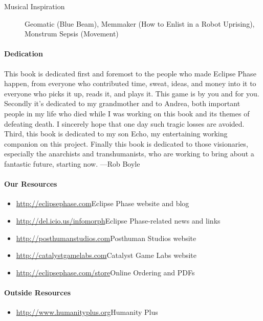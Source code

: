 \begin{description}
\item[Musical Inspiration] Geomatic (Blue Beam), Memmaker (How to Enlist in a Robot Uprising), Monstrum Sepsis (Movement) 

\end{description} 

\pagebreak



\paragraph{Dedication} 

This book is dedicated first and foremost to the people who made Eclipse Phase happen, from everyone who contributed time, sweat, ideas, and money into it to everyone who picks it up, reads it, and plays it. This game is by you and for you. Secondly it's dedicated to my grandmother and to Andrea, both important people in my life who died while I was working on this book and its themes of defeating death. I sincerely hope that one day such tragic losses are avoided. Third, this book is dedicated to my son Echo, my entertaining working companion on this project. Finally this book is dedicated to those visionaries, especially the anarchists and transhumanists, who are working to bring about a fantastic future, starting now. —Rob Boyle 

\paragraph{Our Resources} 

\begin{itemize} \item \url{http://eclipsephase.com}{Eclipse Phase website and blog} \item \url{http://del.icio.us/infomorph}{Eclipse Phase-related news and links} \item \url{http://posthumanstudios.com}{Posthuman Studios website} \item \url{http://catalystgamelabs.com}{Catalyst Game Labs website} \item \url{http://eclipsephase.com/store}{Online Ordering and PDFs} \end{itemize} 

\paragraph{Outside Resources} \label{sec:outside-resources} 

\begin{itemize} \item \url{http://www.humanityplus.org}{Humanity Plus} \end{itemize} 

